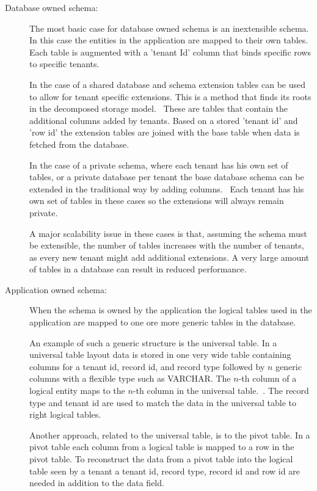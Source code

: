 \begin{description}
	\item[Database owned schema: ] The most basic case for database owned schema is an inextensible schema.
		In this case the entities in the application are mapped to their own tables.
		Each table is augmented with a 'tenant Id' column that binds specific rows to specific tenants.~\cite{aulbach2008multi}

		In the case of a shared database and schema extension tables can be used to allow for tenant specific extensions.
		This is a method that finds its roots in the decomposed storage model.~\cite{copeland1985decomposition}
		These are tables that contain the additional columns added by tenants. 
		Based on a stored 'tenant id' and 'row id' the extension tables are joined with the base table when data is fetched from the database.~\cite{aulbach2008multi}

		In the case of a private schema, where each tenant has his own set of tables, or a private database per tenant the base database schema can be extended in the traditional way by adding columns.~\cite{aulbach2009comparison}
		Each tenant has his own set of tables in these cases so the extensions will always remain private. 
	
		A major scalability issue in these cases is that, assuming the schema must be extensible, the number of tables increases with the number of tenants, as every new tenant might add additional extensions.
		A very large amount of tables in a database can result in reduced performance.~\cite{aulbach2008multi}
	\item[Application owned schema: ] When the schema is owned by the application the logical tables used in the application are mapped to one ore more generic tables in the database.
		
		An example of such a generic structure is the universal table. 
		In a universal table layout data is stored in one very wide table containing columns for a tenant id, record id, and record type followed by $n$ generic columns with a flexible type such as VARCHAR.
		The $n$-th column of a logical entity maps to the $n$-th column in the universal table.~\cite{aulbach2008multi}. The record type and tenant id are used to match the data in the universal table to right logical tables.

		Another approach, related to the universal table, is to the pivot table. 
		In a pivot table each column from a logical table is mapped to a row in the pivot table.
		To reconstruct the data from a pivot table into the logical table seen by a tenant a tenant id, record type, record id and row id are needed in addition to the data field.~\cite{aulbach2008multi}


\end{description}
